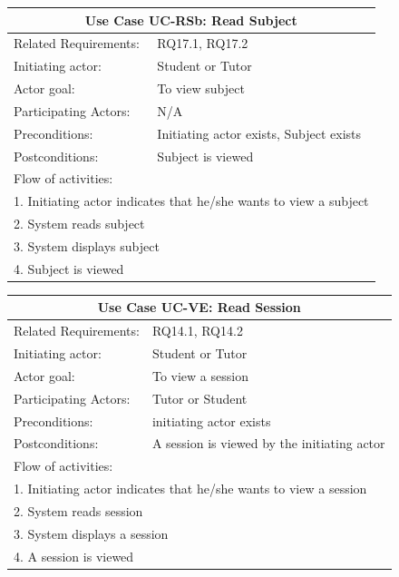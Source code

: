 \documentclass[12pt]{article}
\begin{document}
{    \begin{tabular}{| l | p{10cm}| }
			\hline\multicolumn{2}{|c|}{ \textbf{Use Case UC-RSb: Read Subject} }\\ \hline
			Related Requirements: &  RQ17.1, RQ17.2\\ \hline
			Initiating actor: & Student or Tutor \\ \hline
			Actor goal: & To view subject\\ \hline
			Participating Actors: & N/A\\ \hline
			Preconditions: &Initiating actor exists, Subject exists\\ \hline
			Postconditions: & Subject is viewed\\ \hline
			\multicolumn{2}{|l|}{Flow of activities:}\\ \hline
			\multicolumn{2}{|p{15cm}|}{1. Initiating actor indicates that he/she wants to view a subject}\\
			\multicolumn{2}{|p{15cm}|}{2. System reads subject}\\
			\multicolumn{2}{|l|}{3. System displays subject}\\
			\multicolumn{2}{|l|}{4. Subject is viewed}\\
			 \hline
		\end{tabular}

    \begin{tabular}{| l | p{10cm}| }
			\hline\multicolumn{2}{|c|}{ \textbf{Use Case UC-VE: Read Session} }\\ \hline
			Related Requirements: &  RQ14.1, RQ14.2\\ \hline
			Initiating actor: & Student or Tutor\\ \hline
			Actor goal: & To view a session\\ \hline
			Participating Actors: &Tutor or Student\\ \hline
			Preconditions: &initiating actor exists\\ \hline
			Postconditions: & A session is viewed by the initiating actor\\ \hline
			\multicolumn{2}{|l|}{Flow of activities:}\\ \hline
			\multicolumn{2}{|p{15cm}|}{1. Initiating actor indicates that he/she wants to view a session}\\
			\multicolumn{2}{|p{15cm}|}{2. System reads session}\\
			\multicolumn{2}{|l|}{3. System displays a session}\\
			\multicolumn{2}{|l|}{4. A session is viewed}\\
			 \hline
		\end{tabular}

}
\end{document}
